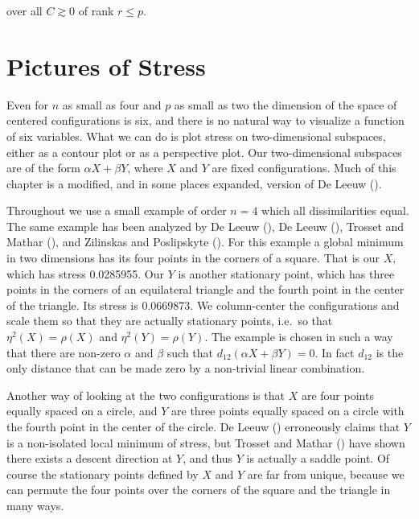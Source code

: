 \documentclass[
  12pt,
  letterpaper,
  DIV=11,
  numbers=noendperiod]{scrreprt}
\theoremstyle{remark}
\begin{document}
over all \(C\gtrsim 0\) of rank \(r\leq p\).

\section{Pictures of Stress}\label{picsstress}

Even for \(n\) as small as four and \(p\) as small as two the dimension
of the space of centered configurations is six, and there is no natural
way to visualize a function of six variables. What we can do is plot
stress on two-dimensional subspaces, either as a contour plot or as a
perspective plot. Our two-dimensional subspaces are of the form
\(\alpha X+\beta Y\), where \(X\) and \(Y\) are fixed configurations.
Much of this chapter is a modified, and in some places expanded, version
of De Leeuw ().

Throughout we use a small example of order \(n=4\) which all
dissimilarities equal. The same example has been analyzed by De Leeuw
(), De Leeuw
(), Trosset and Mathar
(), and Zilinskas and Poslipskyte
(). For this example a
global minimum in two dimensions has its four points in the corners of a
square. That is our \(X\), which has stress 0.0285955. Our \(Y\) is
another stationary point, which has three points in the corners of an
equilateral triangle and the fourth point in the center of the triangle.
Its stress is 0.0669873. We column-center the configurations and scale
them so that they are actually stationary points, i.e.~so that
\(\eta^2(X)=\rho(X)\) and \(\eta^2(Y)=\rho(Y)\). The example is chosen
in such a way that there are non-zero \(\alpha\) and \(\beta\) such that
\(d_{12}(\alpha X+\beta Y)=0\). In fact \(d_{12}\) is the only distance
that can be made zero by a non-trivial linear combination.

Another way of looking at the two configurations is that \(X\) are four
points equally spaced on a circle, and \(Y\) are three points equally
spaced on a circle with the fourth point in the center of the circle. De
Leeuw () erroneously claims that \(Y\)
is a non-isolated local minimum of stress, but Trosset and Mathar
() have shown there exists a
descent direction at \(Y\), and thus \(Y\) is actually a saddle point.
Of course the stationary points defined by \(X\) and \(Y\) are far from
unique, because we can permute the four points over the corners of the
square and the triangle in many ways.
\end{document}
